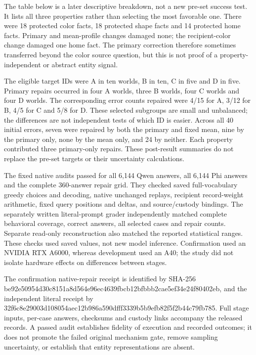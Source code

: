 \documentclass[10pt,letterpaper]{article}
\begin{document}
The table below is a later descriptive breakdown, not a new pre-set success test. It lists all three properties rather than selecting the most favorable one. There were 18 protected color facts, 18 protected shape facts and 14 protected home facts. Primary and mean-profile changes damaged none; the recipient-color change damaged one home fact. The primary correction therefore sometimes transferred beyond the color source question, but this is not proof of a property-independent or abstract entity signal.


The eligible target IDs were A in ten worlds, B in ten, C in five and D in five. Primary repairs occurred in four A worlds, three B worlds, four C worlds and four D worlds. The corresponding error counts repaired were 4/15 for A, 3/12 for B, 4/5 for C and 5/8 for D. These selected subgroups are small and unbalanced; the differences are not independent tests of which ID is easier. Across all 40 initial errors, seven were repaired by both the primary and fixed mean, nine by the primary only, none by the mean only, and 24 by neither. Each property contributed three primary-only repairs. These post-result summaries do not replace the pre-set targets or their uncertainty calculations.


The fixed native audits passed for all 6,144 Qwen answers, all 6,144 Phi answers and the complete 360-answer repair grid. They checked saved full-vocabulary greedy choices and decoding, native unchanged replays, recipient record-weight arithmetic, fixed query positions and deltas, and source/custody bindings. The separately written literal-prompt grader independently matched complete behavioral coverage, correct answers, all selected cases and repair counts. Separate read-only reconstruction also matched the reported statistical ranges. These checks used saved values, not new model inference. Confirmation used an NVIDIA RTX A6000, whereas development used an A40; the study did not isolate hardware effects on differences between stages.


The confirmation native-repair receipt is identified by SHA-256 be92e50954d30c8151a8d564e96ec4639fbcb12bfbbb2cae5ef34e24f80402eb, and the independent literal receipt by 32f6c8e29003d108054aec12b986a590dfff3339b5b9efb82f5f2b44c79fb785. Full stage inputs, per-case answers, checksums and custody links accompany the released records. A passed audit establishes fidelity of execution and recorded outcomes; it does not promote the failed original mechanism gate, remove sampling uncertainty, or establish that entity representations are absent.
\end{document}
